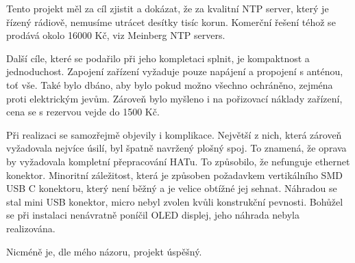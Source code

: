 Tento projekt měl za cíl zjistit a dokázat, že za kvalitní NTP server, který je řízený rádiově, nemusíme
utrácet desítky tisíc korun. Komerční řešení téhož se prodává okolo 16000 Kč, viz Meinberg
NTP servers.

Další cíle, které se podařilo při jeho kompletaci splnit, je kompaktnost a jednoduchost. Zapojení zařízení
vyžaduje pouze napájení a propojení s anténou, toť vše. Také bylo dbáno, aby bylo pokud
možno všechno ochráněno, zejména proti elektrickým jevům. Zároveň bylo myšleno i na
pořizovací náklady zařízení, cena se s rezervou vejde do 1500 Kč.

Při realizaci se samozřejmě objevily i komplikace. Největší z nich, která zároveň
vyžadovala nejvíce úsilí, byl špatně navržený plošný spoj. To znamená, že oprava by
vyžadovala kompletní přepracování HATu. To způsobilo, že nefunguje ethernet konektor.
Minoritní záležitost, která je způsoben požadavkem vertikálního SMD USB C konektoru, který
není běžný a je velice obtížné jej sehnat. Náhradou se stal mini USB konektor, micro nebyl
zvolen kvůli konstrukční pevnosti. Bohůžel se při instalaci nenávratně poníčil OLED
displej, jeho náhrada nebyla realizována.

Nicméně je, dle mého názoru, projekt úspěšný.
